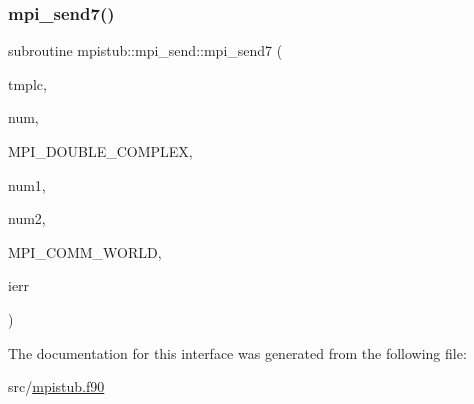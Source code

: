 \subsubsection{\texorpdfstring{mpi\_send7()}{mpi\_send7()}}
{\footnotesize\ttfamily subroutine mpistub\+::mpi\+\_\+send\+::mpi\+\_\+send7 (\begin{DoxyParamCaption}\item[{double precision, dimension(\+:,\+:,\+:)}]{tmplc,  }\item[{}]{num,  }\item[{}]{M\+P\+I\+\_\+\+D\+O\+U\+B\+L\+E\+\_\+\+C\+O\+M\+P\+L\+EX,  }\item[{}]{num1,  }\item[{}]{num2,  }\item[{}]{M\+P\+I\+\_\+\+C\+O\+M\+M\+\_\+\+W\+O\+R\+LD,  }\item[{}]{ierr }\end{DoxyParamCaption})}



The documentation for this interface was generated from the following file\+:\begin{DoxyCompactItemize}
\item 
src/\mbox{\hyperlink{mpistub_8f90}{mpistub.\+f90}}\end{DoxyCompactItemize}
